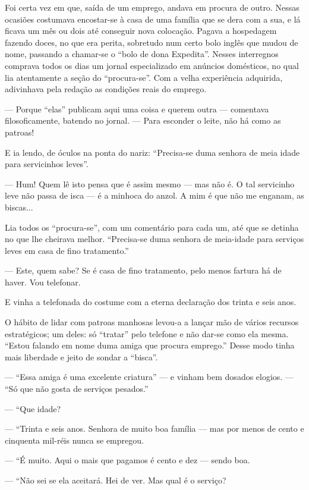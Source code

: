 Foi certa vez em que, saída de um emprego, andava em procura de outro.
Nessas ocasiões costumava encostar-se à casa de uma família que se dera
com a sua, e lá ficava um mês ou dois até conseguir nova colocação.
Pagava a hospedagem fazendo doces, no que era perita, sobretudo num
certo bolo inglês que mudou de nome, passando a chamar-se o ``bolo de
dona Expedita''. Nesses interregnos comprava todos os dias um jornal
especializado em anúncios domésticos, no qual lia atentamente a seção do
``procura-se''. Com a velha experiência adquirida, adivinhava pela
redação as condições reais do emprego.

--- Porque ``elas'' publicam aqui uma coisa e querem outra --- comentava
filosoficamente, batendo no jornal. --- Para esconder o leite, não há
como as patroas!

E ia lendo, de óculos na ponta do nariz: ``Precisa-se duma senhora de
meia idade para servicinhos leves''.

--- Hum! Quem lê isto pensa que é assim mesmo --- mas não é. O tal
servicinho leve não passa de isca --- é a minhoca do anzol. A mim é que
não me enganam, as biscas...

Lia todos os ``procura-se'', com um comentário para cada um, até que se
detinha no que lhe cheirava melhor. ``Precisa-se duma senhora de
meia-idade para serviços leves em casa de fino tratamento.''

--- Este, quem sabe? Se é casa de fino tratamento, pelo menos fartura há
de haver. Vou telefonar.

E vinha a telefonada do costume com a eterna declaração dos trinta e
seis anos.

O hábito de lidar com patroas manhosas levou-a a lançar mão de vários
recursos estratégicos; um deles: só ``tratar'' pelo telefone e não
dar-se como ela mesma. ``Estou falando em nome duma amiga que procura
emprego.'' Desse modo tinha mais liberdade e jeito de sondar a
``bisca''.

--- ``Essa amiga é uma excelente criatura'' --- e vinham bem dosados
elogios. --- ``Só que não gosta de serviços pesados.''

--- ``Que idade?

--- ``Trinta e seis anos. Senhora de muito boa família --- mas por menos
de cento e cinquenta mil-réis nunca se empregou.

--- ``É muito. Aqui o mais que pagamos é cento e dez --- sendo boa.

--- ``Não sei se ela aceitará. Hei de ver. Mas qual é o serviço?

